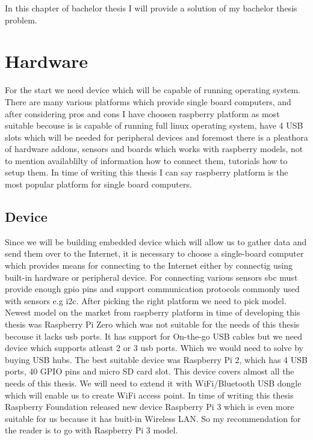 In this chapter of bachelor thesis I will provide a solution of my bachelor thesis problem.
\section{Hardware}
For the start we need device which will be capable of running operating system. There are many various platforms which provide single board computers, and after considering pros and cons I have choosen raspberry platform as most suitable becouse is is capable of running full linux operating system, have 4 USB slots which will be needed for peripheral devices and foremost there is a pleathora of hardware addons, sensors and boards which works with raspberry models, not to mention availablilty of information how to connect them, tutorials how to setup them. In time of writing this thesis I can say raspberry platform is the most popular platform for single board computers.
\subsection{Device}
Since we will be building embedded device which will allow us to gather data and send them over to the Internet, it is necessary to choose a single-board computer which provides means for connecting to the Internet either by connectig using built-in hardware or peripheral device. For connecting various sensors \gls{sbc} must provide enough \gls{gpio} pins and support communication protocols commonly used with sensors e.g \gls{i2c}.
After picking the right platform we need to pick model. Newest model on the market from raspberry platform in time of developing this thesis was Raspberry Pi Zero which was not suitable for the needs of this thesis becouse it lacks usb ports. It has support for On-the-go USB cables but we need device which supports atleast 2 or 3 usb ports. Which we would need to solve by buying USB hubs. The best suitable device was Raspberry Pi 2, which has 4 USB ports, 40 GPIO pins and micro SD card slot. This device covers almost all the needs of this thesis. We will need to extend it with WiFi/Bluetooth USB dongle which will enable us to create WiFi access point. In time of writing this thesis Raspberry Foundation released new device Raspberry Pi 3 which is even more suitable for us because it has buitl-in Wireless LAN. So my recommendation for the reader is to go with Raspberry Pi 3 model.
